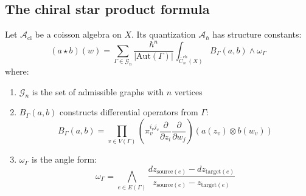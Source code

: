 \subsection{The chiral star product formula}

\begin{theorem}
\label{thm:chiral-kontsevich}
Let $\mathcal{A}_{\text{cl}}$ be a coisson algebra on $X$. Its quantization $\mathcal{A}_\hbar$ has structure constants:
\[(a \star b)(w) = \sum_{\Gamma \in \mathcal{G}_n} \frac{\hbar^{n}}{|\text{Aut}(\Gamma)|} \int_{\overline{C}_n^{\text{ch}}(X)} B_\Gamma(a,b) \wedge \omega_\Gamma\]
where:
\begin{enumerate}
\item $\mathcal{G}_n$ is the set of admissible graphs with $n$ vertices
\item $B_\Gamma(a,b)$ constructs differential operators from $\Gamma$:
\[B_\Gamma(a,b) = \prod_{v \in V(\Gamma)} \left(\pi_v^{i_v j_v} \frac{\partial}{\partial z_i} \frac{\partial}{\partial w_j}\right) (a(z_v) \otimes b(w_v))\]
\item $\omega_\Gamma$ is the angle form:
\[\omega_\Gamma = \bigwedge_{e \in E(\Gamma)} \frac{dz_{\text{source}(e)} - dz_{\text{target}(e)}}{z_{\text{source}(e)} - z_{\text{target}(e)}}\]
\end{enumerate}
\end{theorem}

